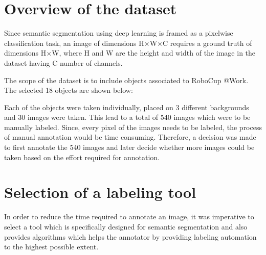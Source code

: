 \documentclass[paper=a4,11pt,parskip=half,toc=listof]{scrartcl}
\begin{document}


\newpage
\setcounter{page}{3} 
\begin{spacing}{1.14}
\tableofcontents
\end{spacing}

\clearpage{}
\listoftables %
\clearpage{}
\listoffigures %
\clearpage{}
\clearpage{}

\setcounter{tocdepth}{4} 
\setcounter{secnumdepth}{4}
\setlength\parindent{0pt}  %



\newpage
\section{Overview of the dataset}
Since semantic segmentation using deep learning is framed as a pixelwise classification task, an image of dimensions H$\times$W$\times$C requires a ground truth of dimensions H$\times$W, where H and W are the height and width of the image in the dataset having C number of channels. 

The scope of the dataset is to include objects associated to RoboCup @Work. The selected 18 objects are shown below:

Each of the objects were taken individually, placed on 3 different backgrounds and 30 images were taken. This lead to a total of 540 images which were to be manually labeled. Since, every pixel of the images needs to be labeled, the process of manual annotation would be time consuming. Therefore, a decision was made to first annotate the 540 images and later decide whether more images could be taken based on the effort required for annotation.

\section{Selection of a labeling tool}
In order to reduce the time required to annotate an image, it was imperative to select a tool which is specifically designed for semantic segmentation and also provides algorithms which helps the annotator by providing labeling automation to the highest possible extent.
\end{document}
